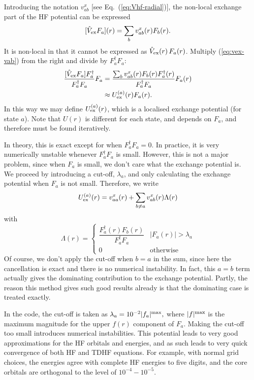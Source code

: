 \documentclass[10pt,twocolumn,a4paper]{article}%
\newcommand{\be}{\begin{equation}}
\newcommand{\ee}{\end{equation}}
\begin{document}
Introducing the notation $v^x_{ab}$ [see Eq.~(\ref{eq:Vhf-radial})], the non-local exchange part of the HF potential can be expressed
\be\label{eq:vex-vab}
 [\hat V_{\rm ex}F_a](r) = \sum_b v^x_{ab}(r) F_b(r).
\ee
It is non-local in that it cannot be expressed as $\hat V_{\rm ex}(r)\,F_a(r)$.
Multiply (\ref{eq:vex-vab}) from the right and divide  by $ F_a^\dag F_a$:
\begin{align}
 \frac{[\hat V_{\rm ex}F_a] F_a^\dag }{F_a^\dag F_a} F_a
&= \frac{\sum_b v^x_{ab}(r) F_b(r)F_a^\dag(r) }{F_a^\dag F_a} F_a(r)\\
&\approx U^{(a)}_{\rm ex}(r)F_a(r).
\end{align}
In this way we may define $U^{(a)}_{\rm ex}(r)$, which is a localised exchange potential (for state $a$).
Note that $U(r)$ is different for each state, and depends on $F_a$, and therefore must be found iteratively.


In theory, this is exact except for when $F_a^\dag F_a=0$.
In practice, it is very numerically unstable whenever $F_a^\dag F_a$ is small.
However, this is not a major problem, since when $F_a$ is small, we don't care what the exchange potential is.
We proceed by introducing a cut-off, $\lambda_a$, and only calculating the exchange potential when $F_a$ is not small.
%
Therefore, we write
\be
 U^{(a)}_{\rm ex}(r) =  
v^x_{aa}(r) + \sum_{b\neq a} v^x_{ab}(r) \Lambda(r)
\ee
with
\be
\Lambda(r) = 
\begin{cases}\dfrac{F_a^\dag(r) F_b(r)}{F_a^\dag F_a} & |F_a(r)|>\lambda_a\\
0&\mathrm{otherwise}
\end{cases}
\ee
%
Of course, we don't apply the cut-off when $b=a$ in the sum, since here the cancellation is exact and there is no numerical instability.
In fact, this $a=b$ term actually gives the dominating contribution to the exchange potential. 
Partly, the reason this method gives such good results already is that the dominating case is treated exactly.

In the code, the cut-off is taken as
$
\lambda_{a} = 10^{-2} |f_a|^{\rm max},
$
where  $|f|^{\rm max}$ is the maximum magnitude for the upper $f(r)$ component of $F_a$.
Making the cut-off too small introduces numerical instabilities.
%
This potential leads to very good approximations for the HF orbitals and energies, and as such leads to very quick convergence of both HF and TDHF equations.
For example, with normal grid choices, the energies agree with complete HF energies to five digits, and the core orbitals are orthogonal to the level of $10^{-4}- 10^{-5}$.
\end{document}
